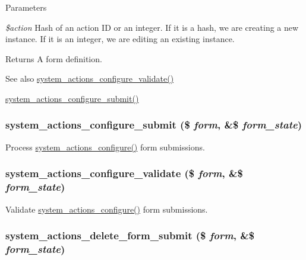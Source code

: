 \begin{DoxyParams}{Parameters}
\item[{\em \$action}]Hash of an action ID or an integer. If it is a hash, we are creating a new instance. If it is an integer, we are editing an existing instance. \end{DoxyParams}
\begin{DoxyReturn}{Returns}
A form definition.
\end{DoxyReturn}
\begin{DoxySeeAlso}{See also}
\hyperlink{system_8admin_8inc_aca39f7ce5afb5a3bc6b0c8bffe7b5b38}{system\_\-actions\_\-configure\_\-validate()} 

\hyperlink{system_8admin_8inc_aaa09c25e2a3e4fbe3ca126733cdd62c8}{system\_\-actions\_\-configure\_\-submit()} 
\end{DoxySeeAlso}
\hypertarget{system_8admin_8inc_aaa09c25e2a3e4fbe3ca126733cdd62c8}{
\subsubsection[{system\_\-actions\_\-configure\_\-submit}]{\setlength{\rightskip}{0pt plus 5cm}system\_\-actions\_\-configure\_\-submit (\$ {\em form}, \/  \&\$ {\em form\_\-state})}}
\label{system_8admin_8inc_aaa09c25e2a3e4fbe3ca126733cdd62c8}
Process \hyperlink{system_8admin_8inc_aff0321246e1c42aab7d73b899065c45d}{system\_\-actions\_\-configure()} form submissions. \hypertarget{system_8admin_8inc_aca39f7ce5afb5a3bc6b0c8bffe7b5b38}{
\subsubsection[{system\_\-actions\_\-configure\_\-validate}]{\setlength{\rightskip}{0pt plus 5cm}system\_\-actions\_\-configure\_\-validate (\$ {\em form}, \/  \&\$ {\em form\_\-state})}}
\label{system_8admin_8inc_aca39f7ce5afb5a3bc6b0c8bffe7b5b38}
Validate \hyperlink{system_8admin_8inc_aff0321246e1c42aab7d73b899065c45d}{system\_\-actions\_\-configure()} form submissions. \hypertarget{system_8admin_8inc_ad081e1fe2621d62873254449a097f2e7}{
\subsubsection[{system\_\-actions\_\-delete\_\-form\_\-submit}]{\setlength{\rightskip}{0pt plus 5cm}system\_\-actions\_\-delete\_\-form\_\-submit (\$ {\em form}, \/  \&\$ {\em form\_\-state})}}
